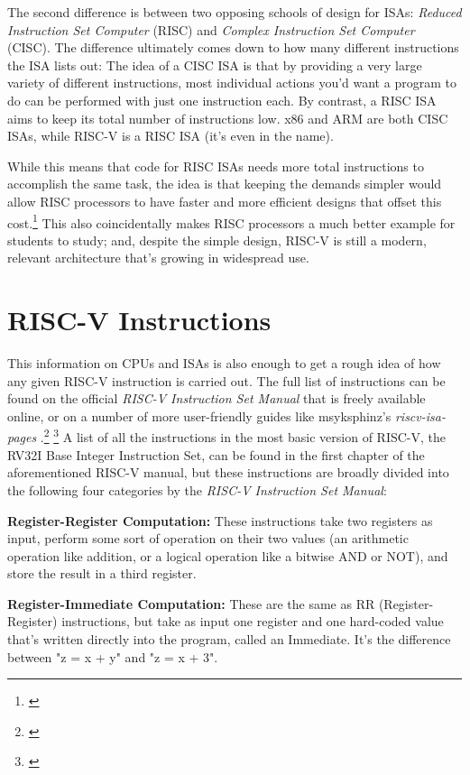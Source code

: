 \documentclass[12pt,twoside]{reedthesis}
\begin{document}
The second difference is between two opposing schools of design for ISAs: \textit{Reduced Instruction Set Computer} (RISC) and \textit{Complex Instruction Set Computer} (CISC). The difference ultimately comes down to how many different instructions the ISA lists out: The idea of a CISC ISA is that by providing a very large variety of different instructions, most individual actions you'd want a program to do can be performed with just one instruction each. By contrast, a RISC ISA aims to keep its total number of instructions low. x86 and ARM are both CISC ISAs, while RISC-V is a RISC ISA (it's even in the name).

While this means that code for RISC ISAs needs more total instructions to accomplish the same task, the idea is that keeping the demands simpler would allow RISC processors to have faster and more efficient designs that offset this cost.\footnote{\cite{denning}}
This also coincidentally makes RISC processors a much better example for students to study; and, despite the simple design, RISC-V is still a modern, relevant architecture that's growing in widespread use.


\section{RISC-V Instructions}

This information on CPUs and ISAs is also enough to get a rough idea of how any given RISC-V instruction is carried out. The full list of instructions can be found on the official \textit{RISC-V Instruction Set Manual} that is freely available online, or on a number of more user-friendly guides like msyksphinz's \textit{riscv-isa-pages} .\footnote{\cite{waterman}} \footnote{\cite{msyksphinz}} A list of all the instructions in the most basic version of RISC-V, the RV32I Base Integer Instruction Set, can be found in the first chapter of the aforementioned RISC-V manual, but these instructions are broadly divided into the following four categories by the \textit{RISC-V Instruction Set Manual}:


\textbf{Register-Register Computation:} These instructions take two registers as input, perform some sort of operation on their two values (an arithmetic operation like addition, or a logical operation like a bitwise AND or NOT), and store the result in a third register.

\textbf{Register-Immediate Computation:} These are the same as RR (Register-Register) instructions, but take as input one register and one hard-coded value that's written directly into the program, called an Immediate. It's the difference between "z = x + y" and "z = x + 3".
\end{document}
